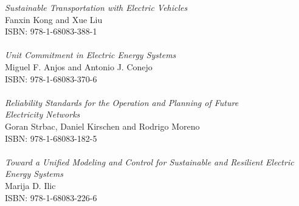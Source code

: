 \vspace{12pt}
\noindent \textit{Sustainable Transportation with Electric Vehicles}\\
Fanxin Kong and Xue Liu\\
ISBN: 978-1-68083-388-1\\
\\
\noindent \textit{Unit Commitment in Electric Energy Systems}\\
Miguel F. Anjos and Antonio J. Conejo\\
ISBN: 978-1-68083-370-6\\
\\
\noindent \textit{Reliability Standards for the Operation and Planning of Future\\ Electricity Networks}\\
Goran Strbac, Daniel Kirschen and Rodrigo Moreno\\
ISBN: 978-1-68083-182-5\\
\\
\noindent \textit{Toward a Unified Modeling and Control for Sustainable and Resilient Electric Energy Systems}\\
Marija D. Ilic\\
ISBN: 978-1-68083-226-6